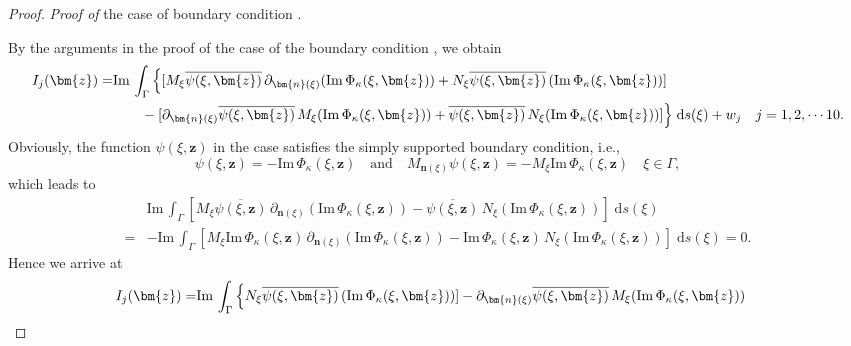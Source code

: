 \documentclass[10pt,a4paper]{article}
\numberwithin{equation}{section}
\begin{document}
\begin{proof}
    \emph{Proof of} the case of boundary condition  \uppercase\expandafter{}.

    By the arguments in the proof of the case of the boundary condition  \uppercase\expandafter{,} we obtain
        \begin{align*}
    I_j(\bm{ z }) 
    \notag
    = &\mathrm{Im}\, \int_{ \Gamma } \Big\{ [M_{\xi}\overline{\psi(\xi ,\bm{ z })}\, \partial_{\bm{n}(\xi )}
        (\mathrm{Im}\, \Phi_{\kappa}(\xi,\bm{z})  ) 
        +N_{\xi } \overline{\psi(\xi ,\bm{ z })} \,
        (\mathrm{Im}\, \Phi_{\kappa}(\xi,\bm{z}) ) ]  \\
   & \qquad - [ \partial_{\bm{n}(\xi )}\overline{\psi(\xi ,\bm{ z })}\,  M_{\xi }
     ( \mathrm{Im}\, \Phi_{\kappa}(\xi,\bm{z})  )
     + \overline{\psi(\xi ,\bm{ z })}\,  N_{\xi }
     ( \mathrm{Im}\, \Phi_{\kappa}(\xi,\bm{z})  )
     ]  \Big\} \;\mathrm{d}s(\xi)
     +w_j \quad j=1,2,\cdots 10.
        \end{align*}
        Obviously, the function $\psi(\xi ,\bm{ z })$ in the case satisfies the simply supported boundary condition, i.e.,
\begin{equation*}
  \psi(\xi ,\bm{ z }) = -  \mathrm{Im}\, \Phi_{\kappa}(\xi,\bm{z}) \quad \mathrm{ and } \quad
M_{\bm{n}(\xi )} \psi(\xi ,\bm{ z }) = - M_{\xi} \mathrm{Im}\, \Phi_{\kappa}(\xi,\bm{z}) \quad
  \xi \in \Gamma,
\end{equation*}
which leads to
    \begin{align*}
      &\mathrm{Im}\, \int_{ \Gamma }[ M_{\xi } \overline{\psi(\xi ,\bm{ z })} \,
       \partial_{\bm{n}(\xi )} ( \mathrm{Im}\, \Phi_{\kappa}(\xi,\bm{z})  )
        - \overline{\psi(\xi ,\bm{ z })}\,
        N_{\xi } ( \mathrm{Im}\, \Phi_{\kappa}(\xi,\bm{z})  )
     ] \;\mathrm{d}s(\xi)\\
      =&  - \mathrm{Im}\, \int_{ \Gamma }[ M_{\xi } \mathrm{Im}\, \Phi_{\kappa}(\xi,\bm{z}) \,
          \partial_{\bm{n}(\xi )}( \mathrm{Im}\, \Phi_{\kappa}(\xi,\bm{z})  )
        - \mathrm{Im}\, \Phi_{\kappa}(\xi,\bm{z}) \,
       N_{\xi }( \mathrm{Im}\, \Phi_{\kappa}(\xi,\bm{z})  )
        ] \;\mathrm{d}s(\xi)=0. 
    \end{align*}
    Hence we arrive at
            \begin{align*}
    I_j(\bm{ z }) 
    \notag
    = &\mathrm{Im}\, \int_{ \Gamma } \Big\{
        N_{\xi } \overline{\psi(\xi ,\bm{ z })} \,
        (\mathrm{Im}\, \Phi_{\kappa}(\xi,\bm{z}) ) ]  
   -  \partial_{\bm{n}(\xi )}\overline{\psi(\xi ,\bm{ z })}\,  M_{\xi }
     ( \mathrm{Im}\, \Phi_{\kappa}(\xi,\bm{z})  )

\end{align*}
\end{proof}
\end{document}
